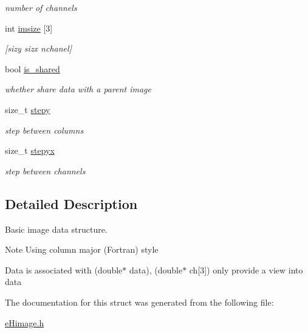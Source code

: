 \begin{DoxyCompactItemize}
\begin{DoxyCompactList}\small\item\em number of channels \end{DoxyCompactList}\item 
\hypertarget{structeHimage_a6a36ac9a6a707ca8494875ba6cc5e5f3}{int \hyperlink{structeHimage_a6a36ac9a6a707ca8494875ba6cc5e5f3}{imsize} \mbox{[}3\mbox{]}}\label{structeHimage_a6a36ac9a6a707ca8494875ba6cc5e5f3}

\begin{DoxyCompactList}\small\item\em \mbox{[}sizy sizx nchanel\mbox{]} \end{DoxyCompactList}\item 
\hypertarget{structeHimage_a02015e3f88dac09b02854a45500f4a5a}{bool \hyperlink{structeHimage_a02015e3f88dac09b02854a45500f4a5a}{is\-\_\-shared}}\label{structeHimage_a02015e3f88dac09b02854a45500f4a5a}

\begin{DoxyCompactList}\small\item\em whether share data with a parent image \end{DoxyCompactList}\item 
\hypertarget{structeHimage_a651a46d0e791768ecfd72ba8c6fbc3af}{size\-\_\-t \hyperlink{structeHimage_a651a46d0e791768ecfd72ba8c6fbc3af}{stepy}}\label{structeHimage_a651a46d0e791768ecfd72ba8c6fbc3af}

\begin{DoxyCompactList}\small\item\em step between columns \end{DoxyCompactList}\item 
\hypertarget{structeHimage_a490e5f631a108b3cbf1dfb3c86495c2d}{size\-\_\-t \hyperlink{structeHimage_a490e5f631a108b3cbf1dfb3c86495c2d}{stepyx}}\label{structeHimage_a490e5f631a108b3cbf1dfb3c86495c2d}

\begin{DoxyCompactList}\small\item\em step between channels \end{DoxyCompactList}\end{DoxyCompactItemize}


\subsection{Detailed Description}
Basic image data structure. 

\begin{DoxyNote}{Note}
Using column major (Fortran) style 

Data is associated with (double$\ast$ data), (double$\ast$ ch\mbox{[}3\mbox{]}) only provide a view into data 
\end{DoxyNote}


The documentation for this struct was generated from the following file\-:\begin{DoxyCompactItemize}
\item 
\hyperlink{eHimage_8h}{e\-Himage.\-h}\end{DoxyCompactItemize}
